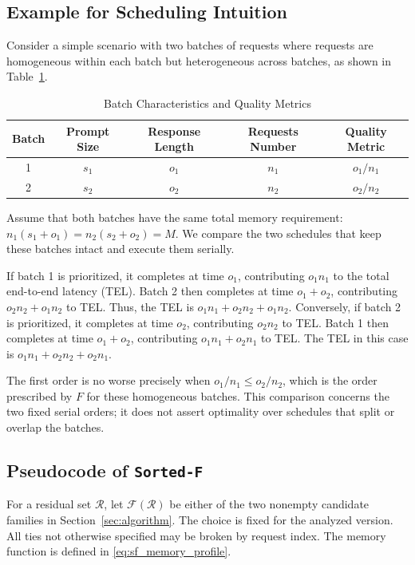 \documentclass[nonblindrev]{informs3_hide}
\newcommand{\sortF}{\texttt{Sorted-F}}
\begin{document}
\subsection{Example for Scheduling Intuition}
\label{append:example}
\begin{example}\label{exp2}
Consider a simple scenario with two batches of requests where requests are
homogeneous within each batch but heterogeneous across batches, as shown
in Table~\ref{tab:batch_characteristics}.
\begin{table}[htbp]
\centering
\caption{Batch Characteristics and Quality Metrics}
\label{tab:batch_characteristics}
\begin{tabular}{ccccc}
\hline
Batch & Prompt Size & Response Length & Requests Number & Quality Metric\\
\hline
1 & $s_1$ & $o_1$ & $n_1$ & $o_1/n_1$\\
2 & $s_2$ & $o_2$ & $n_2$ & $o_2/n_2$\\
\hline
\end{tabular}
\end{table}
Assume that both batches have the same total memory requirement:
$n_1(s_1+o_1)=n_2(s_2+o_2)=M$.
We compare the two schedules that keep these batches
intact and execute them serially.

If batch 1 is prioritized, it completes at time $o_1$, contributing
$o_1n_1$ to the total end-to-end latency (TEL). Batch 2 then completes at
time $o_1+o_2$, contributing $o_2n_2+o_1n_2$ to TEL. Thus, the TEL is
$o_1n_1+o_2n_2+o_1n_2$.
Conversely, if batch 2 is prioritized, it completes at time $o_2$,
contributing $o_2n_2$ to TEL. Batch 1 then completes at time $o_1+o_2$,
contributing $o_1n_1+o_2n_1$ to TEL. The TEL in this case is
$o_1n_1+o_2n_2+o_2n_1$.

The first order is no worse precisely when
$o_1/n_1\le o_2/n_2$, which is the order prescribed by $F$ for these
homogeneous batches. This comparison concerns the two fixed serial
orders; it does not assert optimality over schedules that split or
overlap the batches.
\end{example}

\subsection{Pseudocode of \sortF}
For a residual set $\mathcal R$, let $\mathcal F(\mathcal R)$
be either of the two nonempty candidate families in Section~\ref{sec:algorithm}.
The choice is fixed for the analyzed version. All ties not otherwise
specified may be broken by request index. The memory function is defined
in \eqref{eq:sf_memory_profile}.
\end{document}
